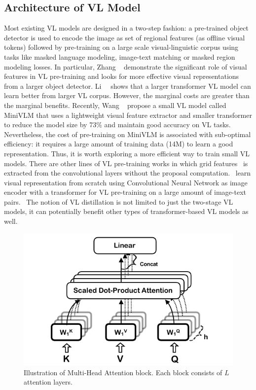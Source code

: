 \subsection{Architecture of VL Model}
Most existing VL models are designed in a two-step fashion: a pre-trained object detector is used to encode the image as
set of regional features (as offline visual tokens) followed by pre-training on a large scale visual-linguistic corpus using tasks like masked language modeling, image-text matching or masked region modeling losses. In particular, Zhang \etal~\citep{zhang2021vinvl} demonstrate the significant role of visual features in VL pre-training and looks for more effective visual representations from a larger object detector. Li~\etal~\citep{li2020oscar} shows that a larger transformer VL model can learn better from larger VL corpus. However, the marginal costs are greater than the marginal benefits. 
Recently, Wang \etal~\citep{wang2020minivlm} propose a small VL model called MiniVLM that uses a lightweight visual feature extractor and smaller transformer to reduce the model size by 73\% and maintain good accuracy on VL tasks. 
Nevertheless, the cost of pre-training on MiniVLM is associated with sub-optimal efficiency: it requires a large amount of training data (14M) to learn a good representation. Thus, it is worth exploring a more efficient way to train small VL models. 
There are other lines of VL pre-training works in which grid features~\citep{huang2020pixel,jiang2020defense} is extracted from the convolutional layers without the proposal computation.~\citep{ramesh2021zero,radford2021learning,desai2020virtex} learn visual representation from scratch using Convolutional Neural Network as image encoder with a transformer for VL pre-training on a large amount of image-text pairs.  The notion of VL distillation is not limited to just the two-stage VL models, it can potentially benefit other types of transformer-based VL models as well. 



\begin{figure}[t]
\centering
\includegraphics[width=.45\textwidth]{./images/attention.pdf}
\caption{ Illustration of Multi-Head Attention block. Each block consists of $L$ attention layers. 
}
\label{fig:multiattention}
\end{figure} 

